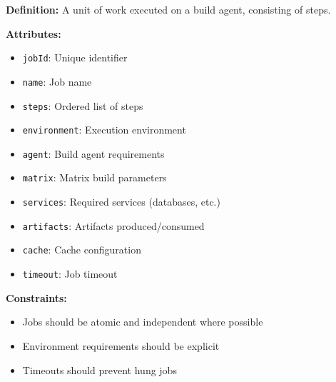 \documentclass[11pt,letterpaper]{article}
\begin{document}
\begin{definitionbox}
\textbf{Definition:} A unit of work executed on a build agent, consisting of steps.

\textbf{Attributes:}
\begin{itemize}[nosep]
    \item \texttt{jobId}: Unique identifier
    \item \texttt{name}: Job name
    \item \texttt{steps}: Ordered list of steps
    \item \texttt{environment}: Execution environment
    \item \texttt{agent}: Build agent requirements
    \item \texttt{matrix}: Matrix build parameters
    \item \texttt{services}: Required services (databases, etc.)
    \item \texttt{artifacts}: Artifacts produced/consumed
    \item \texttt{cache}: Cache configuration
    \item \texttt{timeout}: Job timeout
\end{itemize}

\textbf{Constraints:}
\begin{itemize}[nosep]
    \item Jobs should be atomic and independent where possible
    \item Environment requirements should be explicit
    \item Timeouts should prevent hung jobs
\end{itemize}
\end{definitionbox}
\end{document}
